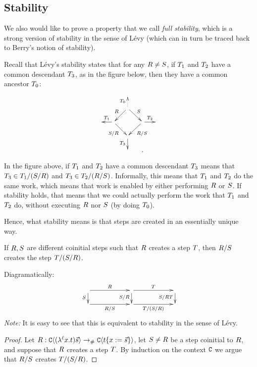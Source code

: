 \bigskip
\subsection*{Stability}

We also would like to prove a property that we call \emph{full stability},
which is a strong version of stability in the sense of Lévy \cite{levy_redex_stability}
(which can in turn be traced back to Berry's notion of stability).

Recall that L\'evy's stability states that for any $R \neq S$,
if $T_1$ and $T_2$ have a common descendant $T_3$, as in the figure below,
then they have a common ancestor $T_0$:
\[
  \xymatrix@C=.5cm@R=.5cm{
    &&&
  \\
    &
    & \ar@{.>}[u]^{\redexthree_0} \ar[dl]_{\redex} \ar[dr]^{\redextwo} &
  \\
    &
    \ar[l]_{\redexthree_1}
    \ar[dr]_{\redextwo/\redex} & & \ar[dl]^{\redex/\redextwo} \ar[r]^{\redexthree_2} &
  \\
    &
    & \ar[d]_{\redexthree_3} &
  \\
  &&&.
  }
\]

In the figure above, if $T_1$ and $T_2$ have a common descendant
$T_3$ means that $T_3 \in T_1 / (S / R)$
and $T_3 \in T_2 / (R / S)$.
Informally, this means that $T_1$ and $T_2$ do the same work,
which means that work is enabled by either performing $R$ or $S$.
If stability holds, that means that we could actually perform the work that
$T_1$ and $T_2$ do, without executing $R$ nor $S$
(by doing $T_0$).

Hence, what stability means is that steps are created in an essentially unique way.


\begin{lemma}[Stability]
If $R,S$ are different coinitial steps such that
$R$ creates a step $T$,
then $R/S$ creates the step $T/(S/R)$.

Diagramatically:
\[
  \xymatrix@R=.5cm@C=2cm{
    \ar[r]^{\redex}
    \ar[d]_{\redextwo}
    &
    \ar[r]^{\redexthree}
    \ar[d]_{\redextwo/\redex}
    &
    \ar[d]_{\redextwo/\redex\redexthree}
  \\
    \ar[r]_{\redex/\redextwo}
    &
    \ar[r]_{\redexthree/(\redextwo/\redex)}
    &
  }
\]
\emph{Note:} It is easy to see that this is equivalent to stability in the sense of Lévy.
\end{lemma}
\begin{proof}
Let $R : \mathtt{C}\langle(\lambda^{\ell} x. t)\vec{s}\rangle \mathrel{\to_{\mathtt{\#}}} \mathtt{C}\langle t\{x := \vec{s}\}\rangle$,
let $S \neq R$ be a step coinitial to $R$,
and suppose that $R$ creates a step $T$.
By induction on the context $\mathtt{C}$ we argue that $R/S$ creates $T/(S/R)$.
\end{proof}

